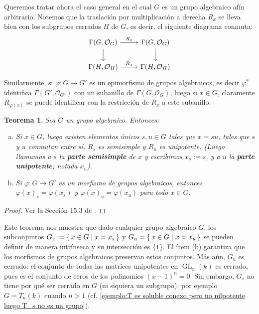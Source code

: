 \documentclass[spanish,12pt]{amsart}
\newtheorem{theorem}{Teorema}[section]
\theoremstyle{definition}
\theoremstyle{remark}
\numberwithin{equation}{section}
\renewcommand{\O}{\mathcal{O}}
\begin{document}
\bigskip

Queremos tratar ahora el caso general en el cual $G$ es un grupo algebraico afín arbitrario. Notemos que la traslación por multiplicación a derecha $R_x$ se lleva bien con los subgrupos cerrados $H$ de $G$, es decir, el siguiente diagrama conmuta:
\[
    \begin{tikzcd}
    \Gamma (G, \O_G) \arrow{r}{R_x} \arrow[d] & \Gamma (G, \O_G) \arrow[d] \\
    \Gamma (H, \O_H) \arrow{r}{R_x} & \Gamma (H, \O_H)
    \end{tikzcd}
\]
Similarmente, si $\varphi : G \to G'$ es un epimorfismo de grupos algebraicos, es decir $\varphi^*$ identifica $\Gamma (G', \O_{G'})$ con un subanillo de $\Gamma (G, \O_G)$, luego si $x \in G$, claramente $R_{\varphi (x)}$ se puede identificar con la restricción de $R_x$ a este subanillo.

\begin{theorem}
Sea $G$ un grupo algebraico. Entonces:
\begin{enumerate}[(a)]
\item Si $x \in G$, luego existen elementos únicos $s,u \in G$ tales que $x = su$, tales que $s$ y $u$ conmutan entre sí, $R_s$ es semisimple y $R_u$ es unipotente. (Luego llamamos a $s$ la \textbf{parte semisimple} de $x$ y escribimos $x_s := s$, y a $u$ la \textbf{parte unipotente}, notada $x_u$).
\item Si $\varphi : G \to G'$ es un morfismo de grupos algebraicos, entonces $\varphi (x)_s = \varphi (x_s)$ y $\varphi (x)_u = \varphi (x_u)$ para todo $x \in G$.
\end{enumerate}
\end{theorem}
\begin{proof}
Ver la Sección 15.3 de \cite{humphreys2012linearAlgebraicGroups}.
\end{proof}

Este teorema nos muestra que dado cualquier grupo algebraico $G$, los subconjuntos $G_s := \set{x \in G | x = x_s}$ y $G_u = \set{x \in G | x = x_u}$ se pueden definir de manera intrínseca y su intersección es $\{1\}$. El ítem (b) garantiza que los morfismos de grupos algebraicos preservan estos conjuntos. Más aún, $G_u$ es cerrado: el conjunto de todas las matrices unipotentes en $\operatorname{GL}_n (k)$ es cerrado, pues es el conjunto de ceros de los polinomios $(x-1)^n = 0$. Sin embargo, $G_s$ no tiene por qué ser cerrado en $G$ (ni siquiera un subgrupo): por ejemplo $G = T_n (k)$ cuando $n > 1$ (cf. \ref{ejemplo:T es soluble conexo pero no nilpotente luego T_s no es un grupo}).
\end{document}
